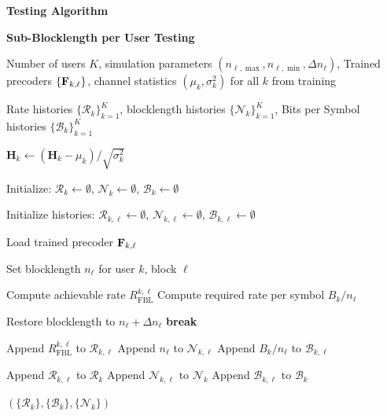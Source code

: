 \documentclass[a4paper, 12pt, onecolumn, journal, twoside, draftclsnofoot]{IEEEtran}
\begin{document}
\newpage


\textbf{Testing Algorithm}

\noindent\textbf{Sub-Blocklength per User Testing}

\begin{algorithmic}[1]

\Require
Number of users $K$, simulation parameters
$(n_{\ell,\max}, n_{\ell,\min}, \Delta n_\ell)$,
Trained precoders $\{{\bf F}_{k,\ell}\}$, channel statistics 
$(\mu_k, \sigma_k^2)$ for all $k$ from training

\Ensure
Rate histories $\{\mathcal{R}_k\}_{k=1}^K$,
blocklength histories $\{\mathcal{N}_{k}\}_{k=1}^K$,
Bits per Symbol histories $\{\mathcal{B}_{k}\}_{k=1}^K$


    \State $\mathbf{H}_k \gets (\mathbf{H}_k - \mu_k)/\sqrt{\sigma_k^2}$

    \State Initialize:
    $\mathcal{R}_k \gets \emptyset$,
    $\mathcal{N}_{k} \gets \emptyset$,
    $\mathcal{B}_{k} \gets \emptyset$


        \State Initialize histories:
        $\mathcal{R}_{k,\ell} \gets \emptyset$,
        $\mathcal{N}_{k,\ell} \gets \emptyset$,
        $\mathcal{B}_{k, \ell} \gets \emptyset$

        \State Load trained precoder ${\bf F}_{k,\ell}$


            \State Set blocklength $n_\ell$ for user $k$, block $\ell$

            \State Compute achievable rate $R_{\mathrm{FBL}}^{k,\ell}$
            \State Compute required rate per symbol $B_k / n_\ell$

                \Statex {}
                \State Restore blocklength to $n_\ell + \Delta n_\ell$
                \State \textbf{break}
            \EndIf

            \State Append $R_{\mathrm{FBL}}^{k,\ell}$ to $\mathcal{R}_{k,\ell}$
            \State Append $n_\ell$ to $\mathcal{N}_{k,\ell}$
            \State Append $B_k/n_\ell$ to $\mathcal{B}_{k, \ell}$

        \EndFor

        \State Append $\mathcal{R}_{k,\ell}$ to $\mathcal{R}_k$
        \State Append $\mathcal{N}_{k,\ell}$ to $\mathcal{N}_{k}$
        \State Append $\mathcal{B}_{k, \ell}$ to $\mathcal{B}_{k}$

    \EndFor

\EndFor

\State \Return $\left(\{\mathcal{R}_k\}, \{\mathcal{B}_{k}\}, \{\mathcal{N}_{k}\}\right)$

\end{algorithmic}
\end{document}
